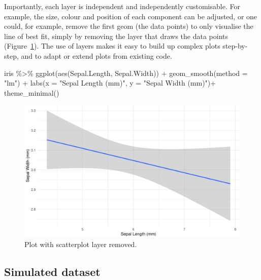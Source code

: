 \documentclass[
  english,
  doc,floatsintext]{apa6}
\newenvironment{Shaded}{\begin{snugshade}}{\end{snugshade}}
\newcommand{\AttributeTok}[1]{\textcolor[rgb]{0.77,0.63,0.00}{#1}}
\newcommand{\FunctionTok}[1]{\textcolor[rgb]{0.00,0.00,0.00}{#1}}
\newcommand{\NormalTok}[1]{#1}
\newcommand{\SpecialCharTok}[1]{\textcolor[rgb]{0.00,0.00,0.00}{#1}}
\newcommand{\StringTok}[1]{\textcolor[rgb]{0.31,0.60,0.02}{#1}}
\begin{document}
Importantly, each layer is independent and independently customisable. For example, the size, colour and position of each component can be adjusted, or one could, for example, remove the first geom (the data points) to only visualise the line of best fit, simply by removing the layer that draws the data points (Figure~\ref{fig:remove-layer}). The use of layers makes it easy to build up complex plots step-by-step, and to adapt or extend plots from existing code.

\begin{Shaded}
\begin{Highlighting}[]
\NormalTok{iris }\SpecialCharTok{\%\textgreater{}\%} \FunctionTok{ggplot}\NormalTok{(}\FunctionTok{aes}\NormalTok{(Sepal.Length, Sepal.Width)) }\SpecialCharTok{+} 
  \FunctionTok{geom\_smooth}\NormalTok{(}\AttributeTok{method =} \StringTok{"lm"}\NormalTok{) }\SpecialCharTok{+}
  \FunctionTok{labs}\NormalTok{(}\AttributeTok{x =} \StringTok{"Sepal Length (mm)"}\NormalTok{, }\AttributeTok{y =} \StringTok{"Sepal Width (mm)"}\NormalTok{)}\SpecialCharTok{+}
  \FunctionTok{theme\_minimal}\NormalTok{()}
\end{Highlighting}
\end{Shaded}

\begin{figure}

{\centering \includegraphics[width=1\linewidth]{images/remove-layer-1} 

}

\caption{Plot with scatterplot layer removed.}\label{fig:remove-layer}
\end{figure}

\hypertarget{simulated-dataset}{%
\subsection{Simulated dataset}\label{simulated-dataset}}
\end{document}
